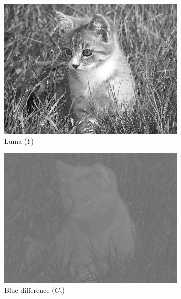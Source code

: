 \begin{figure}[ht]
\centering
\begin{subfigure}{.33\textwidth}
  \centering
  \includegraphics[width=.98\linewidth]{../images/compression_examples/ycrcb_0}
  \caption{Luma ($Y$) }
\end{subfigure}%
\begin{subfigure}{.33\textwidth}
  \centering
  \includegraphics[width=.98\linewidth]{../images/compression_examples/ycrcb_1}
  \caption{Blue difference ($C_b$)}
\end{subfigure}%
\begin{subfigure}{.33\textwidth}
  \centering

\end{subfigure}
\end{figure}
